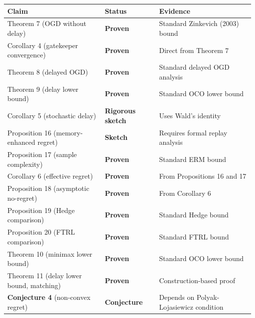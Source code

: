 \documentclass[
  12pt,
]{article}
\begin{document}
\begin{longtable}[]{@{}
  >{\raggedright\arraybackslash}p{}
  >{\raggedright\arraybackslash}p{}
  >{\raggedright\arraybackslash}p{}@{}}
\toprule\noalign{}
\begin{minipage}[b]{\linewidth}\raggedright
Claim
\end{minipage} & \begin{minipage}[b]{\linewidth}\raggedright
Status
\end{minipage} & \begin{minipage}[b]{\linewidth}\raggedright
Evidence
\end{minipage} \\
\midrule\noalign{}
\endhead
\bottomrule\noalign{}
\endlastfoot
Theorem 7 (OGD without delay) & \textbf{Proven} & Standard Zinkevich
(2003) bound \\
Corollary 4 (gatekeeper convergence) & \textbf{Proven} & Direct from
Theorem 7 \\
Theorem 8 (delayed OGD) & \textbf{Proven} & Standard delayed OGD
analysis \\
Theorem 9 (delay lower bound) & \textbf{Proven} & Standard OCO lower
bound \\
Corollary 5 (stochastic delay) & \textbf{Rigorous sketch} & Uses Wald's
identity \\
Proposition 16 (memory-enhanced regret) & \textbf{Sketch} & Requires
formal replay analysis \\
Proposition 17 (sample complexity) & \textbf{Proven} & Standard ERM
bound \\
Corollary 6 (effective regret) & \textbf{Proven} & From Propositions 16
and 17 \\
Proposition 18 (asymptotic no-regret) & \textbf{Proven} & From Corollary
6 \\
Proposition 19 (Hedge comparison) & \textbf{Proven} & Standard Hedge
bound \\
Proposition 20 (FTRL comparison) & \textbf{Proven} & Standard FTRL
bound \\
Theorem 10 (minimax lower bound) & \textbf{Proven} & Standard OCO lower
bound \\
Theorem 11 (delay lower bound, matching) & \textbf{Proven} &
Construction-based proof \\
\textbf{Conjecture 4} (non-convex regret) & \textbf{Conjecture} &
Depends on Polyak-Lojasiewicz condition \\
\end{longtable}
\end{document}
